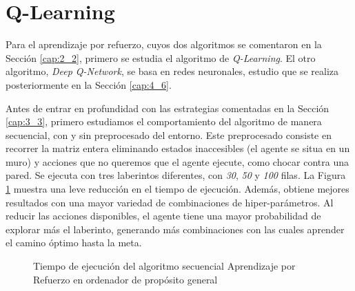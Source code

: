 			
			

\section{Q-Learning}	
	
	Para el aprendizaje por refuerzo, cuyos dos algoritmos se comentaron en la Sección \ref{cap:2_2}, primero se estudia el algoritmo de \textit{Q-Learning}. El otro algoritmo, \textit{Deep Q-Network}, se basa en redes neuronales, estudio que se realiza posteriormente en la Sección \ref{cap:4_6}.
	
	
		Antes de entrar en profundidad con las estrategias comentadas en la Sección \ref{cap:3_3}, primero estudiamos el comportamiento del algoritmo de manera secuencial, con y sin preprocesado del entorno. Este preprocesado consiste en recorrer la matriz entera eliminando estados inaccesibles (el agente se situa en un muro) y acciones que no queremos que el agente ejecute, como chocar contra una pared. Se ejecuta con tres laberintos diferentes, con \textit{30}, \textit{50} y \textit{100} filas. La Figura \ref{fig:rl_preprocesado} muestra una leve reducción en el tiempo de ejecución. Además, obtiene mejores resultados con una mayor variedad de combinaciones de hiper-parámetros. Al reducir las acciones disponibles, el agente tiene una mayor probabilidad de explorar más el laberinto, generando más combinaciones con las cuales aprender el camino óptimo hasta la meta.			
	

		\begin{figure}[!h]
			\centering
			\caption{Tiempo de ejecución del algoritmo secuencial Aprendizaje por Refuerzo en ordenador de propósito general}
			\label{fig:rl_preprocesado}
		\end{figure}
		
